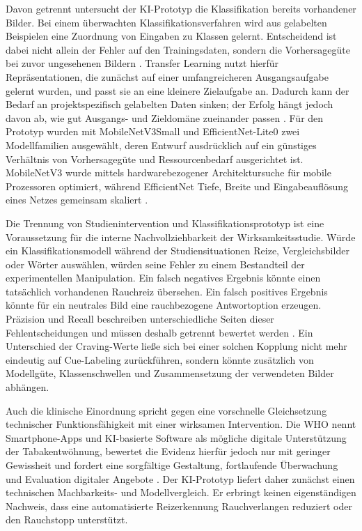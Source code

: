 Davon getrennt untersucht der KI-Prototyp die Klassifikation bereits vorhandener Bilder. Bei einem überwachten Klassifikationsverfahren wird aus gelabelten Beispielen eine Zuordnung von Eingaben zu Klassen gelernt. Entscheidend ist dabei nicht allein der Fehler auf den Trainingsdaten, sondern die Vorhersagegüte bei zuvor ungesehenen Bildern \cite{james_islr_2021}. Transfer Learning nutzt hierfür Repräsentationen, die zunächst auf einer umfangreicheren Ausgangsaufgabe gelernt wurden, und passt sie an eine kleinere Zielaufgabe an. Dadurch kann der Bedarf an projektspezifisch gelabelten Daten sinken; der Erfolg hängt jedoch davon ab, wie gut Ausgangs- und Zieldomäne zueinander passen \cite{pan_transfer_learning_2010}. Für den Prototyp wurden mit MobileNetV3Small und EfficientNet-Lite0 zwei Modellfamilien ausgewählt, deren Entwurf ausdrücklich auf ein günstiges Verhältnis von Vorhersagegüte und Ressourcenbedarf ausgerichtet ist. MobileNetV3 wurde mittels hardwarebezogener Architektursuche für mobile Prozessoren optimiert, während EfficientNet Tiefe, Breite und Eingabeauflösung eines Netzes gemeinsam skaliert \cite{howard_mobilenetv3_2019,tan_efficientnet_2019}.

Die Trennung von Studienintervention und Klassifikationsprototyp ist eine Voraussetzung für die interne Nachvollziehbarkeit der Wirksamkeitsstudie. Würde ein Klassifikationsmodell während der Studiensituationen Reize, Vergleichsbilder oder Wörter auswählen, würden seine Fehler zu einem Bestandteil der experimentellen Manipulation. Ein falsch negatives Ergebnis könnte einen tatsächlich vorhandenen Rauchreiz übersehen. Ein falsch positives Ergebnis könnte für ein neutrales Bild eine rauchbezogene Antwortoption erzeugen. Präzision und Recall beschreiben unterschiedliche Seiten dieser Fehlentscheidungen und müssen deshalb getrennt bewertet werden \cite{manning_ir_2008,james_islr_2021}. Ein Unterschied der Craving-Werte ließe sich bei einer solchen Kopplung nicht mehr eindeutig auf Cue-Labeling zurückführen, sondern könnte zusätzlich von Modellgüte, Klassenschwellen und Zusammensetzung der verwendeten Bilder abhängen.

Auch die klinische Einordnung spricht gegen eine vorschnelle Gleichsetzung technischer Funktionsfähigkeit mit einer wirksamen Intervention. Die WHO nennt Smartphone-Apps und KI-basierte Software als mögliche digitale Unterstützung der Tabakentwöhnung, bewertet die Evidenz hierfür jedoch nur mit geringer Gewissheit und fordert eine sorgfältige Gestaltung, fortlaufende Überwachung und Evaluation digitaler Angebote \cite{who_tobacco_cessation_guideline_2024}. Der KI-Prototyp liefert daher zunächst einen technischen Machbarkeits- und Modellvergleich. Er erbringt keinen eigenständigen Nachweis, dass eine automatisierte Reizerkennung Rauchverlangen reduziert oder den Rauchstopp unterstützt.

